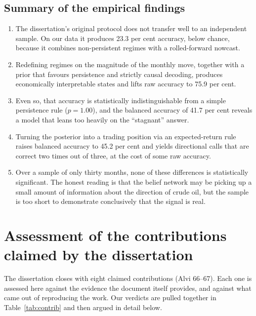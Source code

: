 \documentclass[11pt,a4paper]{article}
\begin{document}
\subsection{Summary of the empirical findings}

\begin{enumerate}
\item The dissertation's original protocol does not transfer well to an independent sample. On
our data it produces 23.3 per cent accuracy, below chance, because it combines non-persistent
regimes with a rolled-forward nowcast.
\item Redefining regimes on the magnitude of the monthly move, together with a prior that favours
persistence and strictly causal decoding, produces economically interpretable states and lifts
raw accuracy to 75.9 per cent.
\item Even so, that accuracy is statistically indistinguishable from a simple persistence rule
($p = 1.00$), and the balanced accuracy of 41.7 per cent reveals a model that leans too heavily
on the ``stagnant'' answer.
\item Turning the posterior into a trading position via an expected-return rule raises balanced
accuracy to 45.2 per cent and yields directional calls that are correct two times out of three,
at the cost of some raw accuracy.
\item Over a sample of only thirty months, none of these differences is statistically
significant. The honest reading is that the belief network may be picking up a small amount of
information about the direction of crude oil, but the sample is too short to demonstrate
conclusively that the signal is real.
\end{enumerate}

\section{Assessment of the contributions claimed by the dissertation}

The dissertation closes with eight claimed contributions (Alvi 66--67). Each one is assessed here
against the evidence the document itself provides, and against what came out of reproducing the
work. Our verdicts are pulled together in Table~\ref{tab:contrib} and then argued in detail
below.
\end{document}
